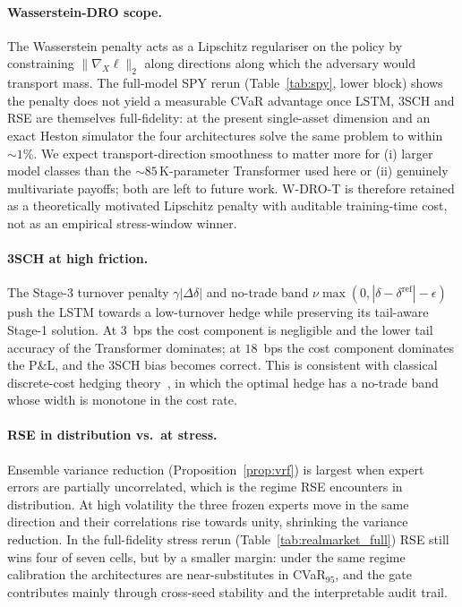 \documentclass[10pt,letterpaper]{article}
\begin{document}
\paragraph{Wasserstein-DRO scope.}
The Wasserstein penalty acts as a Lipschitz regulariser on the
policy by constraining $\|\nabla_X\ell\|_2$ along directions
along which the adversary would transport mass. The full-model
SPY rerun (Table~\ref{tab:spy}, lower block) shows the penalty
does not yield a measurable CVaR advantage once LSTM, 3SCH and
RSE are themselves full-fidelity: at the present single-asset
dimension and an exact Heston simulator the four architectures
solve the same problem to within $\sim 1\%$. We expect
transport-direction smoothness to matter more for (i) larger
model classes than the $\sim 85$\,K-parameter Transformer used
here or (ii) genuinely multivariate payoffs; both are left to
future work. W-DRO-T is therefore retained as a theoretically
motivated Lipschitz penalty with auditable training-time cost,
not as an empirical stress-window winner.

\paragraph{3SCH at high friction.}
The Stage-3 turnover penalty $\gamma|\Delta\delta|$ and no-trade
band $\nu\max(0,|\delta-\delta^{\mathrm{ref}}|-\epsilon)$ push the
LSTM towards a low-turnover hedge while preserving its tail-aware
Stage-1 solution. At $3$~bps the cost component is negligible and
the lower tail accuracy of the Transformer dominates; at $18$~bps
the cost component dominates the P\&L, and the 3SCH bias becomes
correct. This is consistent with classical discrete-cost hedging
theory~\citep{leland1985option,whalley1997asymptotic}, in which
the optimal hedge has a no-trade band whose width is monotone in
the cost rate.

\paragraph{RSE in distribution vs.\ at stress.}
Ensemble variance reduction (Proposition~\ref{prop:vrf}) is
largest when expert errors are partially uncorrelated, which is
the regime RSE encounters in distribution. At high volatility the
three frozen experts move in the same direction and their
correlations rise towards unity, shrinking the variance
reduction. In the full-fidelity stress rerun
(Table~\ref{tab:realmarket_full}) RSE still wins four of seven
cells, but by a smaller margin: under the same regime calibration
the architectures are near-substitutes in CVaR$_{95}$, and the
gate contributes mainly through cross-seed stability and the
interpretable audit trail.
\end{document}
